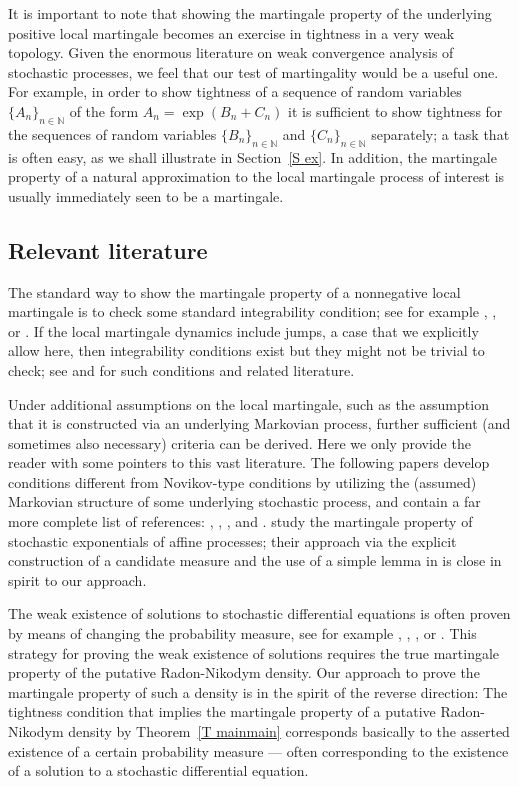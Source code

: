 It is important to note that showing the martingale property of the
underlying positive local martingale becomes an exercise in tightness in a
very weak topology. Given the enormous literature on weak convergence
analysis of stochastic processes, we feel that our test of martingality
would be a useful one. For example, in order to show tightness of a sequence
of random variables $\{A_{n}\}_{n\in \mathbb{N}}$ of the form $A_{n}=\exp
(B_{n}+C_{n})$ it is sufficient to show tightness for the sequences of
random variables $\{B_{n}\}_{n\in \mathbb{N}}$ and $\{C_{n}\}_{n\in \mathbb{N%
}}$ separately; a task that is often easy, as we shall illustrate in Section~\ref{S ex}. In
addition, the martingale property of a natural approximation to the local
martingale process of interest is usually immediately seen to be a
martingale.


\subsection*{Relevant literature}

The standard way to show the martingale property of a nonnegative local
martingale is to check some standard integrability condition; see for
example \citet{Novikov}, \citet{Kazamaki_1983}, or \citet{Ruf_Novikov}. If
the local martingale dynamics include jumps, a case that we explicitly allow
here, then integrability conditions exist but they might not be trivial to
check; see \citet{Lepingle_Memin_Sur} and \citet{Protter_Shimbo} for such
conditions and related literature.

Under additional assumptions on the local martingale, such as the assumption
that it is constructed via an underlying Markovian process, further
sufficient (and sometimes also necessary) criteria can be derived. Here we
only provide the reader with some pointers to this vast literature. The
following papers develop conditions different from Novikov-type conditions
by utilizing the (assumed) Markovian structure of some underlying stochastic
process, and contain a far more complete list of references: \citet{CFY}, %
\citet{Blei_Engelbert_2009}, \citet{MU_martingale}, and %
\citet{Ruf_martingale}. \citet{KMK2010} study the martingale property of
stochastic exponentials of affine processes; their approach via the explicit
construction of a candidate measure and the use of a simple lemma in %
\citet{JacodS} is close in spirit to our approach.

The weak existence of solutions to stochastic differential equations is
often proven by means of changing the probability measure, see for example %
\citet{Portenko_1975}, \citet{Engelbert_Schmidt_1984}, \citet{Yan_1988}, or %
\citet{Stummer_1993}. This strategy for proving the weak existence of
solutions requires the true martingale property of the putative
Radon-Nikodym density. Our approach to prove the martingale property of such
a density is in the spirit of the reverse direction: The tightness condition
that implies the martingale property of a putative Radon-Nikodym density by
Theorem~\ref{T mainmain} corresponds basically to the asserted existence of
a certain probability measure --- often corresponding to the existence of a
solution to a stochastic differential equation.

